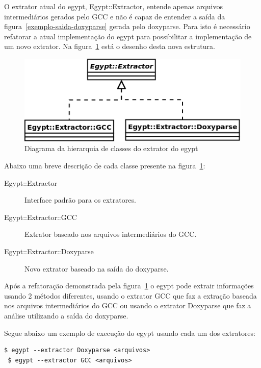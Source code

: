O extrator atual do egypt, Egypt::Extractor, entende apenas arquivos
intermediários gerados pelo GCC e não é capaz de entender a saída da
figura~\ref{exemplo-saida-doxyparse} gerada pelo doxyparse. Para isto é
necessário refatorar a atual implementação do egypt para possibilitar a
implementação de um novo extrator. Na figura~\ref{egypt-diagram-extractor} está
o desenho desta nova estrutura.

\begin{figure}[h]
\center
\includegraphics[scale=0.4]{imagens/egypt-diagram-extractor}
\caption{Diagrama da hierarquia de classes do extrator do egypt}
\label{egypt-diagram-extractor}
\end{figure}

Abaixo uma breve descrição de cada classe presente na
figura~\ref{egypt-diagram-extractor}:

\begin{description}
\item[Egypt::Extractor] Interface padrão para os extratores.
\item[Egypt::Extractor::GCC] Extrator baseado nos arquivos intermediários do GCC.
\item[Egypt::Extractor::Doxyparse] Novo extrator baseado na saída do doxyparse.
\end{description}

Após a refatoração demonstrada pela figura~\ref{egypt-diagram-extractor} o
egypt pode extrair informações usando 2 métodos diferentes, usando o extrator
GCC que faz a extração baseada nos arquivos intermediários do GCC ou usando o
extrator Doxyparse que faz a análise utilizando a saída do doxyparse.

Segue abaixo um exemplo de execução do egypt usando cada um dos extratores:

\begin{Verbatim}[frame=single,fontsize=\relsize{-2},fontfamily=courier]
 $ egypt --extractor Doxyparse <arquivos>
 $ egypt --extractor GCC <arquivos>
\end{Verbatim}

